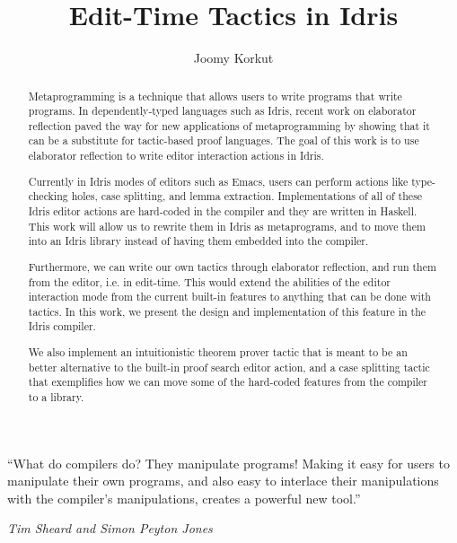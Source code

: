 \documentclass[11pt, ma]{westhesis}
\title{Edit-Time Tactics in Idris}
\author{Joomy Korkut}
\theoremstyle{plain}
\theoremstyle{definition}
\begin{document}
\begin{abstract}
  Metaprogramming is a technique that allows users to write programs that
  write programs. In dependently-typed languages such as Idris, recent work on
  elaborator reflection paved the way for new applications of metaprogramming
  by showing that it can be a substitute for tactic-based proof languages.
  The goal of this work is to use elaborator reflection to write editor
  interaction actions in Idris.

  Currently in Idris modes of editors such as Emacs, users can perform actions
  like type-checking holes, case splitting, and lemma extraction.
  Implementations of all of these Idris editor actions are hard-coded in the
  compiler and they are written in Haskell. This work will allow us to rewrite
  them in Idris as metaprograms, and to move them into an Idris library instead
  of having them embedded into the compiler.

  Furthermore, we can write our own tactics through elaborator
  reflection, and run them from the editor, i.e. in edit-time.
  This would extend the abilities of the editor interaction mode from the
  current built-in features to anything that can be done with tactics.
  In this work, we present the design and implementation of this feature in the
  Idris compiler.

  We also implement an intuitionistic theorem prover tactic that is meant to be an
  better alternative to the built-in proof search editor action, and a case
  splitting tactic that exemplifies how we can move some of the hard-coded
  features from the compiler to a library.
\end{abstract}

\begin{dedication}
  \epigraph{``What do compilers do? They manipulate programs! Making it easy
  for users to manipulate their own programs, and also easy to interlace their
  manipulations with the compiler’s manipulations, creates a powerful new
  tool.''}{\textit{Tim Sheard and Simon Peyton Jones}\cite{th}}
\end{dedication}
\end{document}
